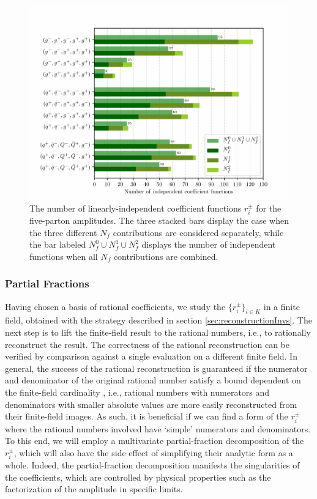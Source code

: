 \begin{figure}[ht]
  \centering
  \includegraphics[width = 1.0\textwidth]{plots/function_space_dimensions.pdf}
  \caption{
    The number of linearly-independent coefficient functions $r_i^\pm$ for the five-parton amplitudes.
    The three stacked bars display the case when the three different $N_f$ contributions are considered separately,
    while the bar labeled $N_f^0\cup N_f^1\cup N_f^2$ displays the number of independent functions
    when all $N_f$ contributions are combined.
  }
  \label{fig:remainderStructure}
\end{figure}



\subsubsection{Partial Fractions}
\label{sec:PartialFractions}

Having chosen a basis of rational coefficients, we study the $\{r_i^\pm\}_{i\in K}$
in a finite field, obtained with the strategy described 
in section \eqref{sec:reconstructionInvs}.
The next step is to lift the finite-field result to the rational numbers, 
i.e., to rationally reconstruct the result. 
The correctness of the rational reconstruction can
be verified by comparison against a single evaluation on a
different finite field. 
In general, the success of the rational reconstruction is
guaranteed if the numerator and denominator of the original rational
number satisfy a bound dependent on the finite-field cardinality
\cite{Wang:1981:PAU:800206.806398, vonManteuffel:2014ixa, Peraro:2016wsq},
i.e., rational numbers with numerators and denominators with
smaller absolute values are more easily reconstructed from their finite-field
images. As such, it is beneficial if we can find a form of the
$r_i^\pm$ where the rational numbers involved have `simple' numerators and
denominators. 
To this end, we will employ a multivariate partial-fraction decomposition
of the $r_i^\pm$, which will also have the side effect of simplifying their
analytic form as a whole. 
Indeed, the partial-fraction decomposition manifests the singularities
of the coefficients, which are controlled by physical properties such
as the factorization of the amplitude in specific limits.



